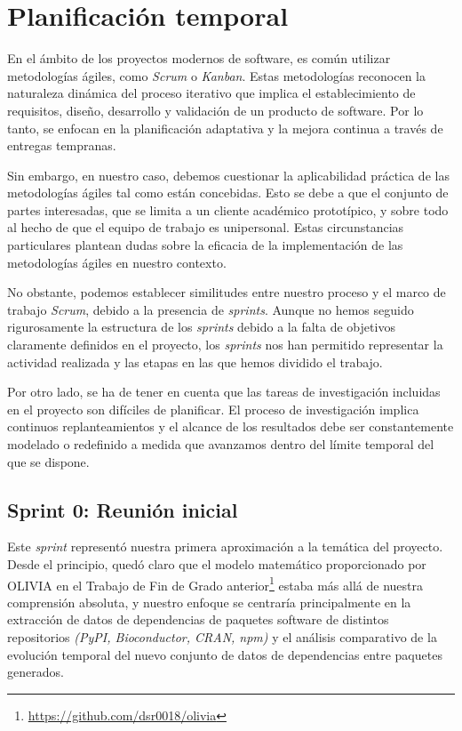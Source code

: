 \section{Planificación temporal}

En el ámbito de los proyectos modernos de software, es común utilizar metodologías ágiles, como \textit{Scrum} 
o \textit{Kanban}. Estas metodologías reconocen la naturaleza dinámica del proceso iterativo que implica el 
establecimiento de requisitos, diseño, desarrollo y validación de un producto de software. Por lo tanto, 
se enfocan en la planificación adaptativa y la mejora continua a través de entregas tempranas.

Sin embargo, en nuestro caso, debemos cuestionar la aplicabilidad práctica de las metodologías ágiles 
tal como están concebidas. Esto se debe a que el conjunto de partes interesadas, que se limita a un 
cliente académico prototípico, y sobre todo al hecho de que el equipo de trabajo es unipersonal. Estas 
circunstancias particulares plantean dudas sobre la eficacia de la implementación de las metodologías 
ágiles en nuestro contexto.

No obstante, podemos establecer similitudes entre nuestro proceso y el marco de trabajo \textit{Scrum}, 
debido a la presencia de \textit{sprints}. Aunque no hemos seguido rigurosamente la estructura de los \textit{sprints} 
debido a la falta de objetivos claramente definidos en el proyecto, los \textit{sprints} nos han permitido 
representar la actividad realizada y las etapas en las que hemos dividido el trabajo.

Por otro lado, se ha de tener en cuenta que las tareas de investigación incluidas en el proyecto son 
difíciles de planificar. El proceso de investigación implica continuos replanteamientos y el alcance de 
los resultados debe ser constantemente modelado o redefinido a medida que avanzamos dentro del límite 
temporal del que se dispone.

\subsection{Sprint 0: Reunión inicial}

Este \textit{sprint} representó nuestra primera aproximación a la temática del proyecto. Desde el principio, quedó 
claro que el modelo matemático proporcionado por OLIVIA en el Trabajo de Fin de Grado anterior\footnote{\url{https://github.com/dsr0018/olivia}}  estaba más allá de 
nuestra comprensión absoluta\cite{Seto-Rey20231}, y nuestro enfoque se centraría principalmente en la extracción de datos 
de dependencias de paquetes software de distintos repositorios \textit{(PyPI, Bioconductor, CRAN, npm)} y el análisis comparativo de 
la evolución temporal del nuevo conjunto de datos de dependencias entre paquetes generados.

